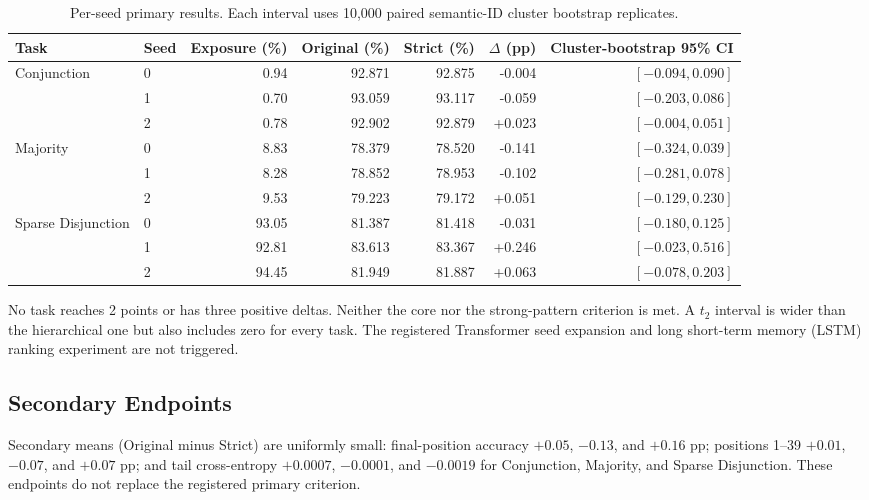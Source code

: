 \begin{table}[H]
\caption{Per-seed primary results.  Each interval uses 10,000 paired
semantic-ID cluster bootstrap replicates.}
\label{tab:boolean-per-seed}
\centering
\scriptsize
\setlength{\tabcolsep}{3.4pt}
\begin{tabular}{llrrrrr}
\toprule
Task & Seed & Exposure (\%) & Original (\%) & Strict (\%) &
$\Delta$ (pp) & Cluster-bootstrap 95\% CI \\
\midrule
\multirow{3}{*}{Conjunction}
& 0 & 0.94 & 92.871 & 92.875 & -0.004 & $[-0.094,0.090]$ \\
& 1 & 0.70 & 93.059 & 93.117 & -0.059 & $[-0.203,0.086]$ \\
& 2 & 0.78 & 92.902 & 92.879 & +0.023 & $[-0.004,0.051]$ \\
\midrule
\multirow{3}{*}{Majority}
& 0 & 8.83 & 78.379 & 78.520 & -0.141 & $[-0.324,0.039]$ \\
& 1 & 8.28 & 78.852 & 78.953 & -0.102 & $[-0.281,0.078]$ \\
& 2 & 9.53 & 79.223 & 79.172 & +0.051 & $[-0.129,0.230]$ \\
\midrule
\multirow{3}{*}{Sparse Disjunction}
& 0 & 93.05 & 81.387 & 81.418 & -0.031 & $[-0.180,0.125]$ \\
& 1 & 92.81 & 83.613 & 83.367 & +0.246 & $[-0.023,0.516]$ \\
& 2 & 94.45 & 81.949 & 81.887 & +0.063 & $[-0.078,0.203]$ \\
\bottomrule
\end{tabular}
\end{table}

No task reaches 2 points or has three positive deltas.  Neither the core
nor the strong-pattern criterion is met.  A $t_2$ interval is wider than the
hierarchical one but also includes zero for every task.  The registered
Transformer seed expansion and long short-term memory (LSTM) ranking
experiment are not triggered.

\subsection{Secondary Endpoints}

Secondary means (Original minus Strict) are uniformly small: final-position
accuracy $+0.05$, $-0.13$, and $+0.16$ pp; positions 1--39 $+0.01$, $-0.07$,
and $+0.07$ pp; and tail cross-entropy $+0.0007$, $-0.0001$, and $-0.0019$
for Conjunction, Majority, and Sparse Disjunction.  These endpoints do not
replace the registered primary criterion.

